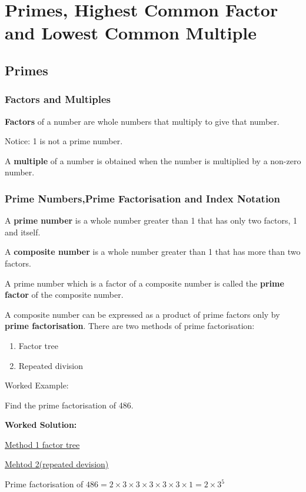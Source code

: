 \documentclass[../main]{subfiles}
\begin{document}
\section{Primes, Highest Common Factor and Lowest Common Multiple}

\subsection{Primes}

\subsubsection{Factors and Multiples}
\textbf{Factors} of a number are whole numbers that multiply to give that number.

Notice: 1 is not a prime number.

A \textbf{multiple} of a number is obtained when the number is multiplied by a
non-zero number.

\subsubsection{Prime Numbers,Prime Factorisation and Index Notation}    

A \textbf{prime number} is a whole number greater than 1 that has only two
factors, 1 and itself.


A \textbf{composite number} is a whole number greater than 1 that has more
than two factors.

A prime number which is a factor of a composite number is called the
\textbf{prime factor} of the composite number.

A composite number can be expressed as a product of prime factors only by
\textbf{prime factorisation}. There are two methods of prime factorisation:

\begin{enumerate}
\item Factor tree
\item Repeated division
\end{enumerate}

Worked Example:

Find the prime factorisation of 486.

\textbf{Worked Solution:}

\underline{Method 1 factor tree}

\underline{Mehtod 2(repeated devision)}


Prime factorisation of $486= 2\times 3 \times 3 \times 3 \times 3 \times 3
\times 1 = 2 \times 3^5$ 
\end{document}
